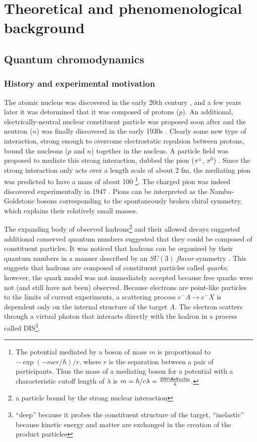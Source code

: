 \chapter{Theoretical and phenomenological background}
\label{ch:background}
\graphicspath{{Chapter-Background/figures/}}

\section{Quantum chromodynamics}
\subsection{History and experimental motivation}

The atomic nucleus was discovered in the early 20th century \cite{Rutherford:1911zz}, and a few years later it was determined that it was composed of protons ($p$).
An additional, electrically-neutral nuclear constituent particle was proposed soon after and the neutron ($n$) was finally discovered in the early 1930s \cite{Chadwick:1932ma}.
Clearly some new type of interaction, strong enough to overcome electrostatic repulsion between protons, bound the nucleons ($p$ and $n$) together in the nucleus.
A particle field was proposed to mediate this strong interaction, dubbed the pion ($\pi^\pm$, $\pi^0$) \cite{Yukawa:1935xg}.
Since the strong interaction only acts over a length scale of about 2 fm, the mediating pion was predicted to have a mass of about 100 \MeV\footnote{The potential mediated by a boson of mass $m$ is proportional to \( - \exp(-mcr/\hbar)/r\), where $r$ is the separation between a pair of participants. Thus the mass of a mediating boson for a potential with a characteristic cutoff length of $\lambda$ is $m = \hbar/c\lambda = \frac{200 \MeVcc \textrm{fm}}{\lambda}$.}.
The charged pion was indeed discovered experimentally in 1947 \cite{Lattes:1947mw}.
Pions can be interpreted as the Nambu-Goldstone bosons corresponding to the spontaneously broken chiral symmetry, which explains their relatively small masses.

The expanding body of observed hadrons\footnote{a particle bound by the strong nuclear interaction} and their allowed decays suggested additional conserved quantum numbers suggested that they could be composed of constituent particles.
It was noticed that hadrons can be organized by their quantum numbers in a manner described by an $SU(3)$ \emph{flavor} symmetry \cite{GellMann:1962xb}.
This suggests that hadrons are composed of constituent particles called \emph{quarks}; however, the quark model was not immediately accepted because free quarks were not (and still have not been) observed.
Because electrons are point-like particles to the limits of current experiments, a scattering process $e^- A \rightarrow e^- X$ is dependent only on the internal structure of the target $A$.
The electron scatters through a virtual photon that interacts directly with the hadron in a process called \ac{DIS}\footnote{``deep'' because it probes the constituent structure of the target, ``inelastic'' because kinetic energy and matter are exchanged in the creation of the product particles}.


